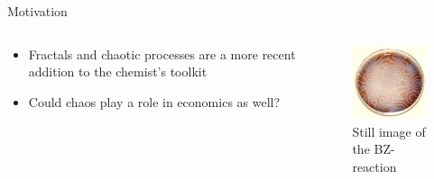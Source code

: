 \documentclass{beamer}
\begin{document}
\begin{frame}{Motivation}
	\begin{columns}
	\begin{column}{0.5\textwidth}
		\begin{itemize}
			\item Fractals and chaotic processes are a more recent addition to the chemist's toolkit\autocite{Beutel2007,Morris2010}
			\item Could chaos play a role in economics as well?
		\end{itemize}
	\end{column}
	\begin{column}{0.5\textwidth}
		\begin{figure}
			\centering
			\includegraphics{bz_reaction.jpg}
			\caption{Still image of the BZ-reaction}
		\end{figure}
	\end{column}
	\end{columns}
\end{frame}
\end{document}
